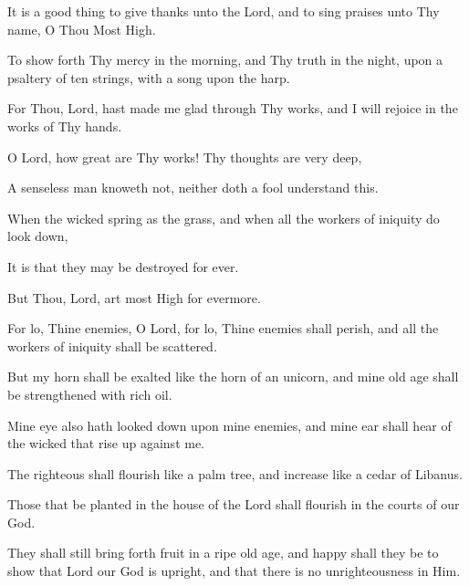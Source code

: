 It is a good thing to give thanks unto the Lord, and to sing praises unto Thy name, O Thou Most High.

To show forth Thy mercy in the morning, and Thy truth in the night, upon a psaltery of ten strings, with a song upon the harp.

For Thou, Lord, hast made me glad through Thy works, and I will rejoice in the works of Thy hands.

O Lord, how great are Thy works! Thy thoughts are very deep,

A senseless man knoweth not, neither doth a fool understand this.

When the wicked spring as the grass, and when all the workers of iniquity do look down,

It is that they may be destroyed for ever.

But Thou, Lord, art most High for evermore.

For lo, Thine enemies, O Lord, for lo, Thine enemies shall perish, and all the workers of iniquity shall be scattered.

But my horn shall be exalted like the horn of an unicorn, and mine old age shall be strengthened with rich oil.

Mine eye also hath looked down upon mine enemies, and mine ear shall hear of the wicked that rise up against me.

The righteous shall flourish like a palm tree, and increase like a cedar of Libanus.

Those that be planted in the house of the Lord shall flourish in the courts of our God.

They shall still bring forth fruit in a ripe old age, and happy shall they be to show that Lord our God is upright, and that there is no unrighteousness in Him.
